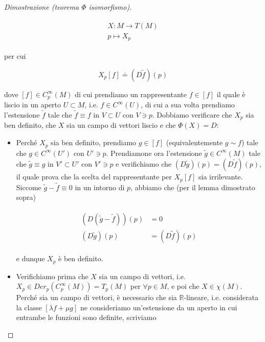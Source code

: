 \begin{proof}[Dimostrazione (teorema $ \Phi $ isomorfismo)]
\begin{itemize}
	\begin{align}
		\begin{split}
			X : M \to T(M)\\
			p \mapsto X_{p}
		\end{split}
	\end{align}

	per cui
	
	\begin{equation}
		X_{p} [f] \doteq (D \tilde{f})(p)
	\end{equation}

	dove $ [f] \in C_{p}^{\infty}(M) $ di cui prendiamo un rappresentante $ f \in [f] $ il quale è liscio in un aperto $ U \subset M $, i.e. $ f \in C^{\infty}(U) $, di cui a sua volta prendiamo l'estensione $ \tilde{f} $ tale che $ \tilde{f} \equiv f $ in $ V \subset U $ con $ V \ni p $. Dobbiamo verificare che $ X_{p} $ sia ben definito, che $ X $ sia un campo di vettori liscio e che $ \Phi(X) = D $:
	
	\begin{itemize}
		\item Perché $ X_{p} $ sia ben definito, prendiamo $ g \in [f] $ (equivalentemente $ g \sim f $) tale che $ g \in C^{\infty}(U') $ con $ U' \ni p $. Prendiamone ora l'estensione $ \tilde{g} \in C^{\infty}(M) $ tale che $ \tilde{g} \equiv g $ in $ V' \subset U' $ con $ V' \ni p $ e verifichiamo che $ (D \tilde{g})(p) = (D \tilde{f})(p) $, il quale prova che la scelta del rappresentante per $ X_{p} [f] $ sia irrilevante. Siccome $ \tilde{g} - \tilde{f} \equiv 0 $ in un intorno di $ p $, abbiamo che (per il lemma dimostrato sopra)
		
		\begin{align}
			\begin{split}
				(D (\tilde{g} - \tilde{f}))(p) &= 0\\
				(D \tilde{g})(p) &= (D \tilde{f})(p)
			\end{split}
		\end{align}
		
		e dunque $ X_{p} $ è ben definito.
		
		\item Verifichiamo prima che $ X $ sia un campo di vettori, i.e. $ X_{p} \in Der_{p}(C_{p}^{\infty}(M)) = T_{p}(M) $ per $ \forall p \in M $, e poi che $ X \in \chi(M) $. Perché sia un campo di vettori, è necessario che sia $ \mathbb{R} $-lineare, i.e. considerata la classe $ [\lambda f + \mu g] $ ne consideriamo un'estensione da un aperto in cui entrambe le funzioni sono definite, scriviamo
		

\end{itemize}
\end{itemize}
\end{proof}
